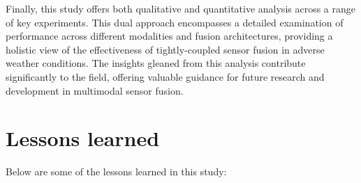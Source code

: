 \documentclass[report.tex]{subfiles}
\begin{document}
    Finally, this study offers both qualitative and quantitative analysis across a range of key experiments. This dual approach encompasses a detailed examination of performance across different modalities and fusion architectures, providing a holistic view of the effectiveness of tightly-coupled sensor fusion in adverse weather conditions. The insights gleaned from this analysis contribute significantly to the field, offering valuable guidance for future research and development in multimodal sensor fusion.

    \section{Lessons learned}

    Below are some of the lessons learned in this study:


    
    
\end{document}
